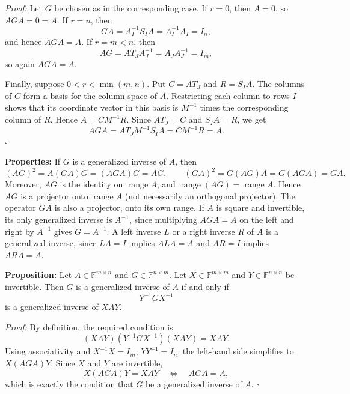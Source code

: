 \documentclass[a4paper,11pt,abstract=true]{scrartcl}
\theoremstyle{dotlessP}
\theoremstyle{dotlessS}
\theoremstyle{remark}
\theoremstyle{definition}
\begin{document}
\begin{claim_box}
\textit{Proof:} Let $G$ be chosen as in the corresponding case. If
$r=0$, then $A=0$, so $AGA=0=A$. If $r=n$, then
\[
GA=A_I^{-1}S_IA=A_I^{-1}A_I=I_n,
\]
and hence $AGA=A$. If $r=m<n$, then
\[
AG=AT_JA_J^{-1}=A_JA_J^{-1}=I_m,
\]
so again $AGA=A$.

Finally, suppose $0<r<\min(m,n)$. Put $C=AT_J$ and $R=S_IA$.
The columns of $C$ form a basis for the column space of $A$. Restricting
each column to rows $I$ shows that its coordinate vector in this basis
is $M^{-1}$ times the corresponding column of $R$. Hence
$A=CM^{-1}R$. Since $AT_J=C$ and $S_IA=R$, we get
\[
AGA=AT_JM^{-1}S_IA=CM^{-1}R=A.
\]
\hfill$\square$
\end{claim_box}

\begin{claim_box}
\textbf{Properties:} If $G$ is a generalized inverse of $A$, then
\[
(AG)^2=A(GA)G=(AGA)G=AG,\qquad
(GA)^2=G(AG)A=G(AGA)=GA.
\]
Moreover, $AG$ is the identity on $\operatorname{range}A$, and
$\operatorname{range}(AG)=\operatorname{range}A$. Hence $AG$ is a
projector onto $\operatorname{range}A$ (not necessarily an orthogonal
projector). The operator $GA$ is also a projector, onto its own range.
If $A$ is square and invertible, its only generalized inverse is
$A^{-1}$, since multiplying $AGA=A$ on the left and right by $A^{-1}$
gives $G=A^{-1}$. A left inverse $L$ or a right inverse $R$ of $A$ is a
generalized inverse, since $LA=I$ implies $ALA=A$ and $AR=I$
implies $ARA=A$.
\end{claim_box}

\begin{problem_box}
\textbf{Proposition:} Let $A\in\mathbb{F}^{m\times n}$ and
$G\in\mathbb{F}^{n\times m}$. Let $X\in\mathbb{F}^{m\times m}$ and
$Y\in\mathbb{F}^{n\times n}$ be invertible. Then $G$ is a
generalized inverse of $A$ if and only if
\[
Y^{-1}GX^{-1}
\]
is a generalized inverse of $XAY$.
\end{problem_box}

\begin{claim_box}
\textit{Proof:} By definition, the required condition is
\[
(XAY)(Y^{-1}GX^{-1})(XAY)=XAY.
\]
Using associativity and $X^{-1}X=I_m$, $YY^{-1}=I_n$, the left-hand
side simplifies to $X(AGA)Y$. Since $X$ and $Y$ are invertible,
\[
X(AGA)Y=XAY
\quad\Longleftrightarrow\quad
AGA=A,
\]
which is exactly the condition that $G$ be a generalized inverse of
$A$. \hfill$\square$
\end{claim_box}
\end{document}
